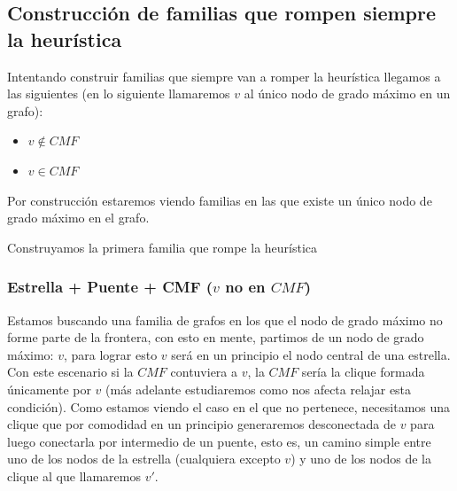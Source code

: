 %
%
%			
%
%
%
%			

\subsection{Construcci\'on de familias que rompen siempre la heur\'istica}

Intentando construir familias que siempre van a romper la heur\'istica llegamos a las siguientes
(en lo siguiente llamaremos $v$ al \'unico nodo de grado m\'aximo en un grafo):
\begin{itemize}
	\item{$v \notin CMF$}
	\item{$v \in CMF$}
\end{itemize}

Por construcci\'on estaremos viendo familias en las que existe un \'unico nodo de grado m\'aximo en el grafo.

Construyamos la primera familia que rompe la heur\'istica

\subsubsection{Estrella + Puente + CMF ($v$ no en $CMF$)}

Estamos buscando una familia de grafos en los que el nodo de grado m\'aximo no forme parte de la 
frontera, con esto en mente, partimos de un nodo de grado m\'aximo: $v$, para lograr esto $v$ ser\'a
en un principio el nodo central de una estrella. Con este escenario si la $CMF$ contuviera a $v$, la
$CMF$ ser\'ia la clique formada \'unicamente por $v$ (m\'as adelante estudiaremos como nos afecta 
relajar esta condici\'on). Como estamos viendo el caso en el que no pertenece, necesitamos una clique 
que por comodidad en un principio generaremos desconectada de $v$ para luego conectarla por 
intermedio de un puente, esto es, un camino simple entre uno de los nodos de la estrella (cualquiera
excepto $v$) y uno de los nodos de la clique al que llamaremos $v'$. 


